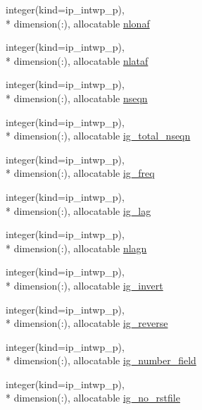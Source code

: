 \begin{DoxyCompactItemize}
\item 
integer(kind=ip\+\_\+intwp\+\_\+p), \\*
dimension(\+:), allocatable \hyperlink{classmod__oasis__namcouple_ae413f2dc402b7c018e341081b8d6e208}{nlonaf}
\item 
integer(kind=ip\+\_\+intwp\+\_\+p), \\*
dimension(\+:), allocatable \hyperlink{classmod__oasis__namcouple_a80d81b2f026a2d0dc2de27b9ee04f7af}{nlataf}
\item 
integer(kind=ip\+\_\+intwp\+\_\+p), \\*
dimension(\+:), allocatable \hyperlink{classmod__oasis__namcouple_a20e9486f3e8bbdcee0de935e9be3a2e8}{nseqn}
\item 
integer(kind=ip\+\_\+intwp\+\_\+p), \\*
dimension(\+:), allocatable \hyperlink{classmod__oasis__namcouple_a09ed8be682296ef584f0d5777b2c6482}{ig\+\_\+total\+\_\+nseqn}
\item 
integer(kind=ip\+\_\+intwp\+\_\+p), \\*
dimension(\+:), allocatable \hyperlink{classmod__oasis__namcouple_affa727bb033c0f4d09962f2b4d1b4ab5}{ig\+\_\+freq}
\item 
integer(kind=ip\+\_\+intwp\+\_\+p), \\*
dimension(\+:), allocatable \hyperlink{classmod__oasis__namcouple_ae2c74692147a54b3f7534301d509f766}{ig\+\_\+lag}
\item 
integer(kind=ip\+\_\+intwp\+\_\+p), \\*
dimension(\+:), allocatable \hyperlink{classmod__oasis__namcouple_aad06af35c92de78d71671d39bcbb1690}{nlagn}
\item 
integer(kind=ip\+\_\+intwp\+\_\+p), \\*
dimension(\+:), allocatable \hyperlink{classmod__oasis__namcouple_a0b8948452bbd8cf1dc9f0fccc17c344d}{ig\+\_\+invert}
\item 
integer(kind=ip\+\_\+intwp\+\_\+p), \\*
dimension(\+:), allocatable \hyperlink{classmod__oasis__namcouple_adc4dcf30da2b88fb1798dd02e7833bc1}{ig\+\_\+reverse}
\item 
integer(kind=ip\+\_\+intwp\+\_\+p), \\*
dimension(\+:), allocatable \hyperlink{classmod__oasis__namcouple_a0751f74f7ce6520d8e860b9da14d1d9d}{ig\+\_\+number\+\_\+field}
\item 
integer(kind=ip\+\_\+intwp\+\_\+p), \\*
dimension(\+:), allocatable \hyperlink{classmod__oasis__namcouple_a1cc3d37d7819c112f14b6cec03266561}{ig\+\_\+no\+\_\+rstfile}

\end{DoxyCompactItemize}
